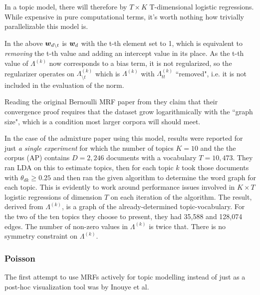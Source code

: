 In a topic model, there will therefore by $T \times K$ T-dimensional logistic regressions. While expensive in pure computational terms, it's worth nothing how trivially parallelizable this model is.

In the above $\bm w_{d \setminus t}$ is $\bm w_d$ with the t-th element set to 1, which is equivalent to \emph{removing} the t-th value and adding an intercept value in its place. As the t-th value of $\Lambda^{(k)}$ now corresponds to a bias term, it is not regularized, so the regularizer operates on $\Lambda^{(k)}_{\setminus t}$ which is $\Lambda^{(k)}$ with $\Lambda^{(k)}_{tt}$ ``removed", i.e. it is not included in the evaluation of the norm.


Reading the original Bernoulli MRF paper from  they claim that their convergence proof requires that the dataset grow logarithmically with the ``graph size", which is a condition most larger corpora will should meet. 

In the case of the admixture paper using this model, results were reported for just \emph{a single experiment} for which the number of topics $K=10$ and the the corpus (AP) contains $D=2,246$ documents with a vocabulary $T=10,473$. They ran LDA on this to estimate topics, then for each topic $k$ took those documents with $\theta_{dk} \geq 0.25$ and then ran the given algorithm to determine the word graph for each topic. This is evidently to work around performance issues involved in $K \times T$ logistic regressions of dimension $T$ on each iteration of the algorithm. The result, derived from $\Lambda^{(k)}$, is a graph of the already-determined topic-vocabulary. For the two of the ten topics they choose to present, they had 35,588 and 128,074 edges. The number of non-zero values in $\Lambda^{(k)}$ is twice that. There is no symmetry constraint on $\Lambda^{(k)}$.

\subsubsection*{Poisson}
\newcommand \vl {\vv{\lambda}}
\newcommand \bl {\Lambda}
\newcommand \blk {\Lambda^{(k)}}

The first attempt to use MRFs actively for topic modelling instead of just as a post-hoc visualization tool was by Inouye et al\cite{Inouye2014}.

